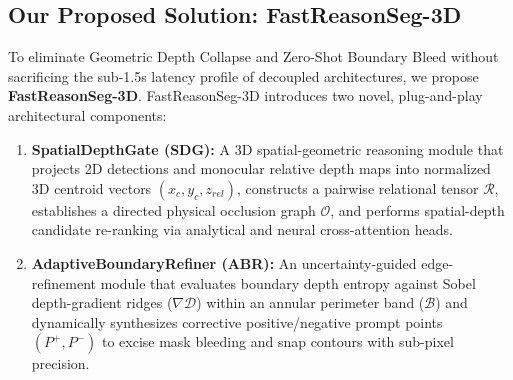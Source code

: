 \documentclass[10pt,twocolumn,letterpaper]{article}
\begin{document}
\subsection{Our Proposed Solution: FastReasonSeg-3D}
To eliminate Geometric Depth Collapse and Zero-Shot Boundary Bleed without sacrificing the sub-1.5s latency profile of decoupled architectures, we propose \textbf{FastReasonSeg-3D}. FastReasonSeg-3D introduces two novel, plug-and-play architectural components:
\begin{enumerate}[leftmargin=*,itemsep=2pt,topsep=2pt]
    \item \textbf{SpatialDepthGate (SDG):} A 3D spatial-geometric reasoning module that projects 2D detections and monocular relative depth maps into normalized 3D centroid vectors $(x_c, y_c, z_{rel})$, constructs a pairwise relational tensor $\mathcal{R}$, establishes a directed physical occlusion graph $\mathcal{O}$, and performs spatial-depth candidate re-ranking via analytical and neural cross-attention heads.
    \item \textbf{AdaptiveBoundaryRefiner (ABR):} An uncertainty-guided edge-refinement module that evaluates boundary depth entropy against Sobel depth-gradient ridges ($\nabla \mathcal{D}$) within an annular perimeter band ($\mathcal{B}$) and dynamically synthesizes corrective positive/negative prompt points $(P^+, P^-)$ to excise mask bleeding and snap contours with sub-pixel precision.
\end{enumerate}
\end{document}
